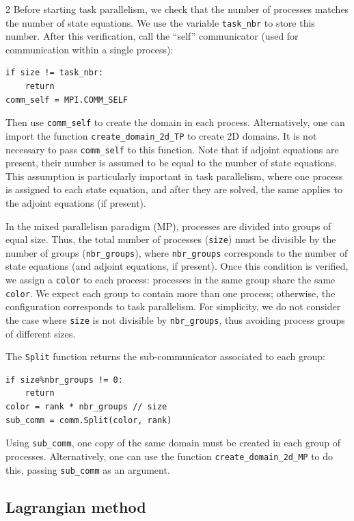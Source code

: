 \documentclass[a4paper, oneside]{article}
\newcommand{\tred}{\textcolor{red}}
\newcommand{\code}[1]{\texttt{#1}}
\begin{document}
\begin{multicols}{2}
Before starting task parallelism, we check that the number of processes matches
the number of state equations. We use the variable
\code{task\_nbr} to store this number.
After this verification, call the ``self'' communicator
(used for communication within a single process):
\begin{lstlisting}
if size != task_nbr:
    return
comm_self = MPI.COMM_SELF
\end{lstlisting}
Then use \code{comm\_self} to create the domain in each process.
Alternatively, one can import the function \code{create\_domain\_2d\_TP}
to create 2D domains. It is not necessary to pass \code{comm\_self} to this function.
Note that if adjoint equations are present,
their number is assumed to be equal to the number of state equations.
This assumption is particularly important in task parallelism,
where one process is assigned to each state equation,
and after they are solved,
the same applies to the adjoint equations (if present).

In the mixed parallelism paradigm (MP),
processes are divided into groups of equal size.
Thus, the total number of processes (\code{size}) must be divisible
by the number of groups (\code{nbr\_groups}), where \code{nbr\_groups}
corresponds to the number of state equations (and adjoint equations, if present).
Once this condition is verified, we assign a \code{color} to each process:
processes in the same group share the same \code{color}.
We expect each group to contain more than one process;
otherwise, the configuration corresponds to task parallelism.
For simplicity,
we do not consider the case where \code{size} is not divisible by \code{nbr\_groups},
thus avoiding process groups of different sizes.


The \code{Split} function returns the sub-communicator associated to each group:
\begin{lstlisting}
if size%nbr_groups != 0:
	return
color = rank * nbr_groups // size
sub_comm = comm.Split(color, rank)
\end{lstlisting}
Using \code{sub\_comm}, one copy of the same domain must be created
in each group of processes.
Alternatively, one can use the function \code{create\_domain\_2d\_MP} to do this,
passing \code{sub\_comm} as an argument.


\subsection{Lagrangian method}
\label{sub:lagrangian}


\end{multicols}
\end{document}
